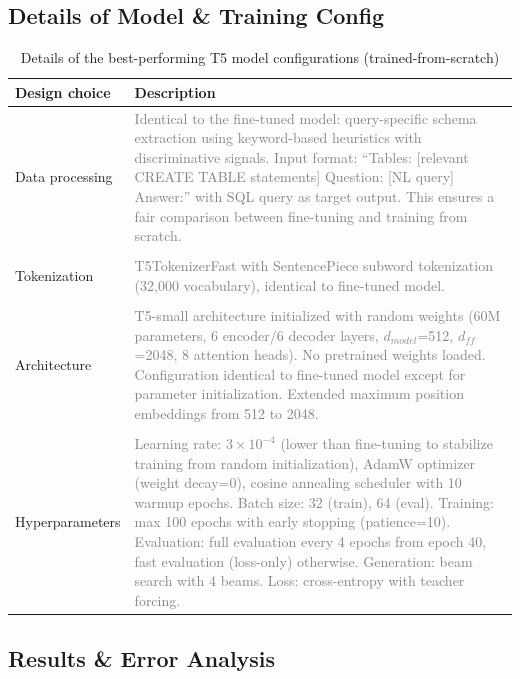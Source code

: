 \documentclass{article}
\begin{document}
\newpage
\subsection*{Details of Model \& Training Config}

\begin{table}[h!]
\centering
\begin{tabular}{p{3.5cm}p{10cm}}
\toprule
Design choice & Description \\
\midrule
Data processing & \textcolor{gray}{Identical to the fine-tuned model: query-specific schema extraction using keyword-based heuristics with discriminative signals. Input format: ``Tables: [relevant CREATE TABLE statements] Question: [NL query] Answer:'' with SQL query as target output. This ensures a fair comparison between fine-tuning and training from scratch. } \\

\\
Tokenization & \textcolor{gray}{T5TokenizerFast with SentencePiece subword tokenization (32,000 vocabulary), identical to fine-tuned model.} \\
\\
Architecture & \textcolor{gray}{T5-small architecture initialized with random weights (60M parameters, 6 encoder/6 decoder layers, $d_{model}$=512, $d_{ff}$=2048, 8 attention heads). No pretrained weights loaded. Configuration identical to fine-tuned model except for parameter initialization. Extended maximum position embeddings from 512 to 2048.} \\
\\
Hyperparameters & \textcolor{gray}{Learning rate: $3 \times 10^{-4}$ (lower than fine-tuning to stabilize training from random initialization), AdamW optimizer (weight decay=0), cosine annealing scheduler with 10 warmup epochs. Batch size: 32 (train), 64 (eval). Training: max 100 epochs with early stopping (patience=10). Evaluation: full evaluation every 4 epochs from epoch 40, fast evaluation (loss-only) otherwise. Generation: beam search with 4 beams. Loss: cross-entropy with teacher forcing. } \\
\bottomrule
\end{tabular}
\caption{Details of the best-performing T5 model configurations (trained-from-scratch)}
\label{tab:t5_results_ft}
\end{table}

\newpage
\subsection*{Results \& Error Analysis}
\end{document}
